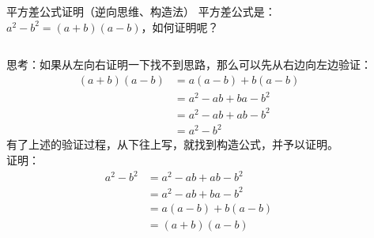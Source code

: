 \documentclass[aspectratio=169]{ctexbeamer} %
\begin{document}
\begin{frame}[t]{平方差公式证明（逆向思维、构造法）}
平方差公式是：$a^2 - b^2 = (a + b)(a - b)$，如何证明呢？
\vspace{1cm}
\begin{columns}[t]
思考：如果从左向右证明一下找不到思路，那么可以先从右边向左边验证：
\begin{align*}
  (a + b)(a - b) &= a(a - b) + b(a - b)  \\
  &= a^2 - ab + ba - b^2 \\
  &= a^2 - ab + ab - b^2 \\
  &= a^2 - b^2
 \end{align*}
 有了上述的验证过程，从下往上写，就找到构造公式，并予以证明。\\
 证明：
\begin{align*}
  a^2 - b^2  &= a^2 - ab + ab - b^2 \\
  &= a^2 - ab + ba - b^2 \\
  &= a(a - b) + b(a - b) \\
  &= (a + b)(a - b) 
 \end{align*}
\end{columns}
\end{frame}
\end{document}
